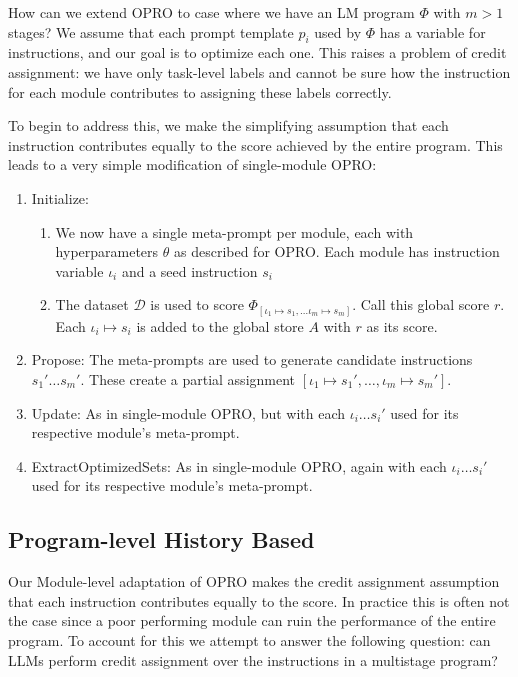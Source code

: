 How can we extend OPRO to case where we have an LM program $\Phi$ with $m > 1$ stages? We assume that each prompt template $p_{i}$ used by $\Phi$ has a variable for instructions, and our goal is to optimize each one. This raises a problem of credit assignment: we have only task-level labels and cannot be sure how the instruction for each module contributes to assigning these labels correctly.

To begin to address this, we make the simplifying assumption that each instruction contributes equally to the score achieved by the entire program. This leads to a very simple modification of single-module OPRO:
\begin{enumerate}
\item Initialize: 
\begin{enumerate}
\item We now have a single meta-prompt per module, each with hyperparameters $\theta$ as described for OPRO. Each module has instruction variable $\iota_{i}$ and a seed instruction $s_{i}$
\item The dataset $\mathcal{D}$ is used to score $\Phi_{[\iota_{1}\mapsto s_{1}, \ldots \iota_{m}\mapsto s_{m}]}$. Call this global score $r$. Each $\iota_{i}\mapsto s_{i}$ is added to the global store $A$ with $r$ as its score.
\end{enumerate}
\item Propose: The meta-prompts are used to generate candidate instructions $s_{1}' \ldots s_{m}'$. These create a partial assignment $[\iota_{1} \mapsto s_{1}', \ldots, \iota_{m} \mapsto s_{m}']$.
\item Update: As in single-module OPRO, but with each $\iota_{i} \ldots s_{i}'$ used for its respective module's meta-prompt.
\item ExtractOptimizedSets: As in single-module OPRO, again with each $\iota_{i} \ldots s_{i}'$ used for its respective module's meta-prompt.
\end{enumerate}

\subsection{Program-level History Based}
Our Module-level adaptation of OPRO makes the credit assignment assumption that each instruction contributes equally to the score.  In practice this is often not the case since a poor performing module can ruin the performance of the entire program.  To account for this we attempt to answer the following question: can LLMs perform credit assignment over the instructions in a multistage program?

